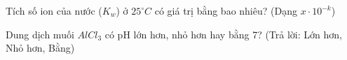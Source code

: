 \begin{bt}
    Tích số ion của nước ($K_w$) ở $25^\circ C$ có giá trị bằng bao nhiêu? (Dạng $x \cdot 10^{-k}$)
\end{bt}
\begin{bt}
    Dung dịch muối $AlCl_3$ có pH lớn hơn, nhỏ hơn hay bằng 7? (Trả lời: Lớn hơn, Nhỏ hơn, Bằng)
\end{bt}


